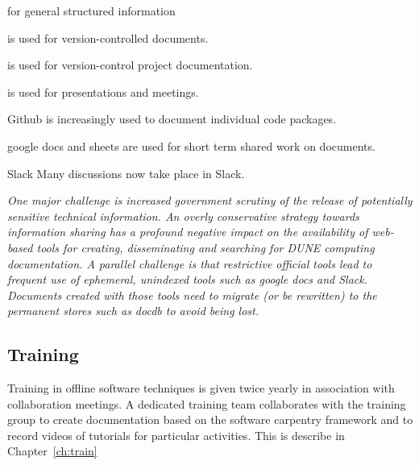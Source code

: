 \documentclass[../main-v1.tex]{subfiles}
\begin{document}
\begin{description}
\item[Mediawiki] for general structured information
\item[docdb]  is used for version-controlled documents. 
\item[edms]  is used for version-control project documentation.
\item[indico]  is used for presentations and meetings. 
\item[github] Github is increasingly used to document individual code packages.
\item[google tools] google docs and sheets are used for short term shared work on documents.
\item{Slack}  Many discussions now take place in Slack.


\end{description}

{\it One major challenge is increased government  scrutiny of the release of potentially sensitive technical information.  An overly conservative strategy towards information sharing has a profound negative impact on the availability of web-based tools for creating, disseminating and searching for DUNE computing documentation. A parallel  challenge is that restrictive official tools lead to frequent use of ephemeral, unindexed tools such as google docs and Slack.  Documents created with those tools need to migrate (or be rewritten) to the permanent stores such as docdb to avoid being lost.  } 





\subsection{Training}
Training in offline software techniques is given twice yearly in association with  collaboration meetings.  A dedicated training team collaborates with the  training group to create documentation based on the software carpentry framework and to record videos of tutorials for particular activities. This is describe in Chapter~\ref{ch:train}
\end{document}
